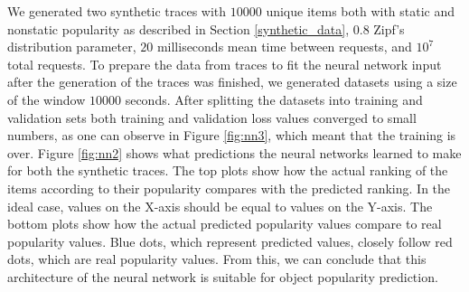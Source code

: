 We generated two synthetic traces with $ 10000 $ unique items both with static and nonstatic popularity as described in Section \ref{synthetic_data}, $ 0.8 $ Zipf's distribution parameter, $ 20 $ milliseconds mean time between requests, and $ 10^7 $ total requests. To prepare the data from traces to fit the neural network input after the generation of the traces was finished, we generated datasets using a size of the window $ 10000 $ seconds. After splitting the datasets into training and validation sets both training and validation loss values converged to small numbers, as one can observe in Figure \ref{fig:nn3}, which meant that the training is over. Figure \ref{fig:nn2} shows what predictions the neural networks learned to make for both the synthetic traces. The top plots show how the actual ranking of the items according to their popularity compares with the predicted ranking. In the ideal case, values on the X-axis should be equal to values on the Y-axis. The bottom plots show how the actual predicted popularity values compare to real popularity values. Blue dots, which represent predicted values, closely follow red dots, which are real popularity values. From this, we can conclude that this architecture of the neural network is suitable for object popularity prediction.


